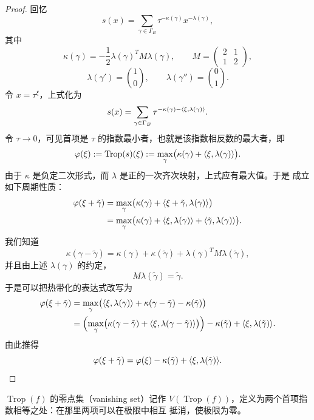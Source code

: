 \begin{proof}
回忆
\[
s(x)=\sum_{\gamma\in\Gamma_B}\tau^{-\kappa(\gamma)}x^{-\lambda(\gamma)},
\]
其中
\[
\kappa(\gamma)=-\frac12\lambda(\gamma)^TM\lambda(\gamma),\qquad
M=\begin{pmatrix}2&1\\1&2\end{pmatrix},
\]
\[
\lambda(\gamma')=\binom{1}{0},\qquad \lambda(\gamma'')=\binom{0}{1}.
\]
令 $x=\tau^{\xi}$，上式化为
\[
s(x)=\sum_{\gamma\in\Gamma_B}\tau^{-\kappa(\gamma)-\langle \xi,\lambda(\gamma)\rangle}.
\]
令 $\tau\to0$，可见首项是 $\tau$ 的指数最小者，也就是该指数相反数的最大者，即
\begin{equation}\label{eq:1-11}
\varphi(\xi):=\operatorname{Trop}(s)(\xi):=
\max_{\gamma}\bigl(\kappa(\gamma)+\langle \xi,\lambda(\gamma)\rangle\bigr).
\end{equation}
由于 $\kappa$ 是负定二次形式，而 $\lambda$ 是正的一次齐次映射，上式应有最大值。于是
成立如下周期性质：
\begin{align*}
\varphi(\xi+\tilde\gamma)
&=\max_{\gamma}\bigl(\kappa(\gamma)+\langle \xi+\tilde\gamma,\lambda(\gamma)\rangle\bigr)\\
&=\max_{\gamma}\bigl(\kappa(\gamma)+\langle \xi,\lambda(\gamma)\rangle
  +\langle \tilde\gamma,\lambda(\gamma)\rangle\bigr).
\end{align*}
我们知道
\[
\kappa(\gamma-\tilde\gamma)=\kappa(\gamma)+\kappa(\tilde\gamma)
+\lambda(\gamma)^TM\lambda(\tilde\gamma),
\]
并且由上述 $\lambda(\gamma)$ 的约定，
\[
M\lambda(\tilde\gamma)=\tilde\gamma.
\]
于是可以把热带化的表达式改写为
\begin{align*}
\varphi(\xi+\tilde\gamma)
&=\max_{\gamma}\bigl(\langle \xi,\lambda(\gamma)\rangle
  +\kappa(\gamma-\tilde\gamma)-\kappa(\tilde\gamma)\bigr)\\
&=\Bigl(\max_{\gamma}\bigl(\kappa(\gamma-\tilde\gamma)
  +\langle \xi,\lambda(\gamma-\tilde\gamma)\rangle\bigr)\Bigr)
  -\kappa(\tilde\gamma)+\langle \xi,\lambda(\tilde\gamma)\rangle.
\end{align*}
由此推得
\[
\varphi(\xi+\tilde\gamma)=\varphi(\xi)-\kappa(\tilde\gamma)
+\langle \xi,\lambda(\tilde\gamma)\rangle.
\]
\end{proof}

\begin{definition}[热带化的零点集]\label{def:vanishing}
$\operatorname{Trop}(f)$ 的零点集（vanishing set）记作
$V(\operatorname{Trop}(f))$，定义为两个首项指数相等之处：在那里两项可以在极限中相互
抵消，使极限为零。
\end{definition}

